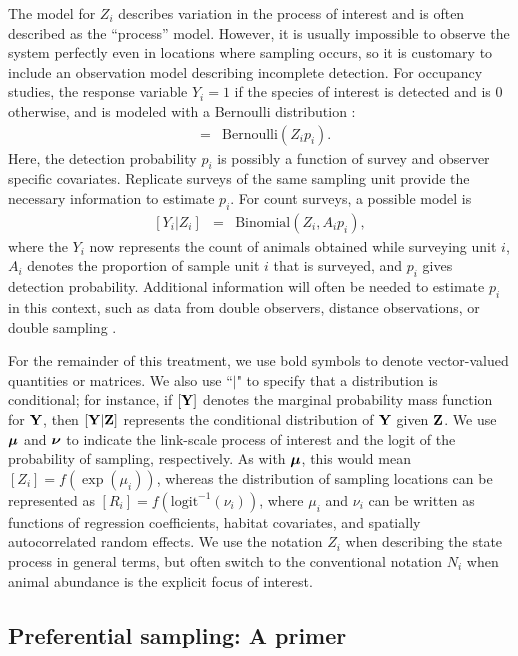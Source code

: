 \documentclass[times,mee,doublespace,]{besauth2}
\begin{document}
The model for $Z_i$ describes variation in the process of interest and is often described as the ``process'' model.  However, it is usually impossible to observe the system perfectly even in locations where sampling occurs, so it is customary to include an observation model describing incomplete detection.  For occupancy studies, the response variable $Y_i = 1$ if the species of interest is detected and is 0 otherwise, and is modeled with a Bernoulli distribution \citep{Royle2008}:
\begin{eqnarray}
  [Y_i|Z_i] & = & \text{Bernoulli}(Z_i p_i).
\end{eqnarray}
 Here, the detection probability $p_i$ is possibly a function of survey and observer specific covariates. Replicate surveys of the same sampling unit provide the necessary information to estimate $p_i$.   For count surveys, a possible model is
\begin{eqnarray}
  \label{eq:obs_binomial}
  [Y_i|Z_i] & = & \text{Binomial}(Z_i, A_i p_i),
\end{eqnarray}
where the $Y_i$ now represents the count of animals obtained while surveying unit $i$, $A_i$ denotes the proportion of sample unit $i$ that is surveyed, and $p_i$ gives detection probability.  Additional information will often be needed to estimate $p_i$ in this context, such as data from double observers, distance observations, or double sampling \citep[see e.g.][]{BucklandEtAl2001,Royle2004,Borchers2006,ConnEtAl2014}.

For the remainder of this treatment, we use bold symbols to denote vector-valued quantities or matrices.  We also use ``$|$" to specify that a distribution is conditional; for instance, if $[{\bf Y}]$ denotes the marginal probability mass function for ${\bf Y}$, then  $[{\bf Y}|{\bf Z}]$ represents the conditional distribution of ${\bf Y}$ given ${\bf Z}$.  We use $\boldsymbol{\mu}$ and $\boldsymbol{\nu}$ to indicate the link-scale process of interest and the logit of the probability of sampling, respectively.  As with $\boldsymbol{\mu}$, this would mean $[Z_i] = f(\exp(\mu_i))$, whereas the distribution of sampling locations can be represented as $[R_i] = f(\text{logit}^{-1}(\nu_i))$, where $\mu_i$ and $\nu_i$ can be written as functions of regression coefficients, habitat covariates, and spatially autocorrelated random effects.  We use the notation $Z_i$ when describing the state process in general terms, but often switch to the conventional notation $N_i$ when animal abundance is the explicit focus of interest.

\subsection{Preferential sampling: A primer}
\end{document}
